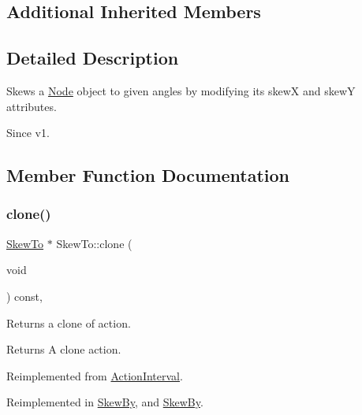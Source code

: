 \subsection*{Additional Inherited Members}


\subsection{Detailed Description}
Skews a \hyperlink{classNode}{Node} object to given angles by modifying it\textquotesingle{}s skewX and skewY attributes. 

\begin{DoxySince}{Since}
v1. 
\end{DoxySince}


\subsection{Member Function Documentation}
\mbox{\label{classSkewTo_a9d7fb4b11a50457b43453cfdd5753231}} 
\subsubsection{\texorpdfstring{clone()}{clone()}\hspace{0.1cm}{\footnotesize\ttfamily [1/2]}}
{\footnotesize\ttfamily \hyperlink{classSkewTo}{Skew\+To} $\ast$ Skew\+To\+::clone (\begin{DoxyParamCaption}\item[{void}]{ }\end{DoxyParamCaption}) const\hspace{0.3cm}{\ttfamily [override]}, {\ttfamily [virtual]}}

Returns a clone of action.

\begin{DoxyReturn}{Returns}
A clone action. 
\end{DoxyReturn}


Reimplemented from \hyperlink{classActionInterval_abc93ce0c2f54a90eb216a7803f25f44a}{Action\+Interval}.



Reimplemented in \hyperlink{classSkewBy_a44399096122f1351b972ee260c667ea0}{Skew\+By}, and \hyperlink{classSkewBy_ae18e543aa3c28c8365543ae751530aff}{Skew\+By}.

\mbox{\label{classSkewTo_a7959089aa46cca257a931b4f6d806679}} 
